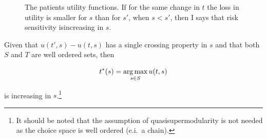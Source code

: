 \documentclass[10pt,a4paper]{article} %
\begin{document}
\begin{figure}

\caption{\label{fig:The-patients-utility}The patients utility functions. If for the same change in $t$ the loss in utility is smaller for $s$ than for $s'$, when $s<s'$, then I says that risk sensitivity isincreasing in $s$.}
\end{figure}

\begin{prop}
Given that $u(t',s)-u(t,s)$ has a single crossing property in $s$ and that both $S$ and $T$ are well ordered sets, then

\[
t^{*}(s)=\argmax_{s\in S}u(t,s)
\]

is increasing in $s$.\footnote{It should be noted that the assumption of quasisupermodularity is not needed as the choice space is well ordered (e.i.\ a chain). %
}
\end{prop}
\end{document}
